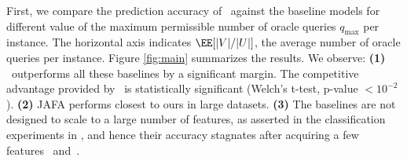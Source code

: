 \documentclass[letterpaper]{article}
\renewcommand{\cite}{\citep}
\begin{document}
 First, we compare the prediction accuracy of \our\ against 
 the baseline models for different 
 value of the maximum permissible number of oracle queries $q_{\max}$ per instance. The horizontal axis indicates $\EE[|V|/|U|]$, the average number of oracle queries per instance.
Figure \ref{fig:main} summarizes the results. 
We observe:
\textbf{(1)} \our\ outperforms all these baselines by a significant margin. 
The competitive advantage provided by \our\ is statistically significant (Welch's t-test, p-value $< 10^{-2}$). \textbf{(2)} JAFA performs closest to ours in large datasets. \textbf{(3)} The baselines are not designed to scale to a large number of features, as asserted in the classification experiments in \cite{gsm}, and hence their accuracy stagnates after acquiring a few features~\cite[Fig. 6, 7]{gsm} and~\cite[Fig. 3]{jafa}. 
\end{document}
